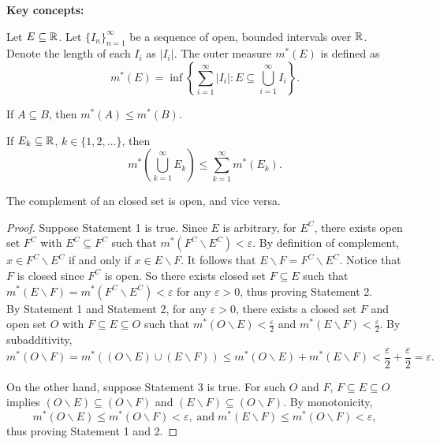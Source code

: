 \documentclass[class=book, crop=false]{standalone}
\begin{document}
    \noindent \textbf{Key concepts:}
    \begin{defIndep}
        Let $E \subseteq \mathbb{R}$. Let $\{I_n\}^{\infty}_{n = 1}$ be a sequence of open, bounded intervals over $\mathbb{R}$. Denote the length of each $I_i$ as $|I_i|$. The outer measure $m^*(E)$ is defined as
        \begin{equation*}
            m^*(E) = \inf\left\{\sum^{\infty}_{i = 1} |I_i| : E \subseteq \bigcup^{\infty}_{i = 1} I_i\right\}.
        \end{equation*}
    \end{defIndep}
    \begin{theoremIndep}[Monotonicity]
        If $A \subseteq B$, then $m^*(A) \leq m^*(B)$.
    \end{theoremIndep}
    \begin{theoremIndep}[Subadditivity]
        If $E_k \subseteq \mathbb{R}$, $k \in \{1, 2, \dots\}$, then
        \begin{equation*}
            m^*\left(\bigcup^{\infty}_{k = 1} E_k\right) \leq \sum^{\infty}_{k = 1} m^*(E_k).
        \end{equation*}
    \end{theoremIndep}
    \begin{theoremIndep}
        The complement of an closed set is open, and vice versa.
    \end{theoremIndep}
    \begin{proof}
        Suppose Statement 1 is true. Since $E$ is arbitrary, for $E^C$, there exists open set $F^C$ with $E^C \subseteq F^C$ such that $m^*(F^C \backslash E^C) < \varepsilon$. By definition of complement, $x \in F^C \backslash E^C$ if and only if $x \in E \backslash F$. It follows that $E \backslash F = F^C \backslash E^C$. Notice that $F$ is closed since $F^C$ is open. So there exists closed set $F \subseteq E$ such that $m^*(E \backslash F) = m^*(F^C \backslash E^C) < \varepsilon$ for any $\varepsilon > 0$, thus proving Statement 2. \\

        \noindent By Statement 1 and Statement 2, for any $\varepsilon > 0$, there exists a closed set $F$ and open set $O$ with $F \subseteq E \subseteq O$ such that $m^*(O \backslash E) < \frac{\varepsilon}{2}$ and $m^*(E \backslash F) < \frac{\varepsilon}{2}$. By subadditivity,
        \begin{equation*}
            m^*(O \backslash F) = m^*((O \backslash E) \cup (E \backslash F)) \leq m^*(O \backslash E) + m^*(E \backslash F) < \frac{\varepsilon}{2} + \frac{\varepsilon}{2} = \varepsilon.
        \end{equation*}

        \noindent On the other hand, suppose Statement 3 is true. For such $O$ and $F$, $F \subseteq E \subseteq O$ implies $(O \backslash E) \subseteq (O \backslash F)$ and $(E \backslash F) \subseteq (O \backslash F)$. By monotonicity,
        \begin{equation*}
            m^*(O \backslash E) \leq m^*(O \backslash F) < \varepsilon, \;\text{and}\; m^*(E \backslash F) \leq m^*(O \backslash F) < \varepsilon,
        \end{equation*}
        thus proving Statement 1 and 2.
    \end{proof}
\end{document}
